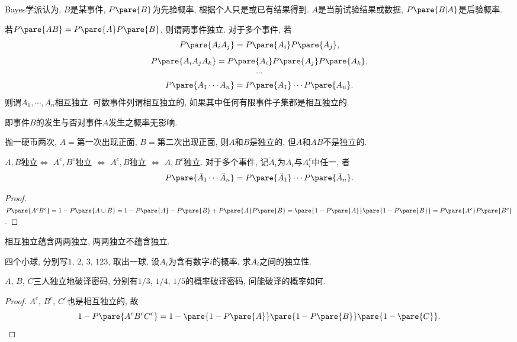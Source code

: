 \documentclass[../Statistics.tex]{subfiles}
\begin{document}
\begin{remark}
    Bayes学派认为, $B$是某事件, $P\pare{B}$为先验概率, 根据个人只是或已有结果得到. $A$是当前试验结果或数据, $P\pare{B\vert A}$是后验概率.
\end{remark}
\begin{definition}
    若$P\pare{AB} = P\pare{A}P\pare{B}$, 则谓两事件独立. 对于多个事件, 若
    \[ P\pare{A_iA_j} = P\pare{A_i}P\pare{A_j}, \]
    \[ P\pare{A_iA_jA_k} = P\pare{A_i}P\pare{A_j}P\pare{A_k}, \]
    \[ \cdots \]
    \[ P\pare{A_1\cdots A_n} = P\pare{A_1} \cdots P\pare{A_n}. \]
    则谓$A_1,\cdots, A_n$相互独立. 可数事件列谓相互独立的, 如果其中任何有限事件子集都是相互独立的.
\end{definition}
\begin{remark}
    即事件$B$的发生与否对事件$A$发生之概率无影响.
\end{remark}
\begin{sample}
    \begin{ex}
        抛一硬币两次, $A=$第一次出现正面, $B=$第二次出现正面, 则$A$和$B$是独立的, 但$A$和$AB$不是独立的.
    \end{ex}
\end{sample}
\begin{theorem}
    $A,B$独立$\Leftrightarrow$ $A^c,B^c$独立 $\Leftrightarrow$ $A^c,B$独立 $\Leftrightarrow$ $A,B^c$独立. 对于多个事件, 记$\tilde{A}_i$为$A_i$与$A_i^c$中任一, 者
    \[ P\pare{\tilde{A}_1\cdots \tilde{A}_n} = P\pare{\tilde{A}_1}\cdots P\pare{\tilde{A}_n}. \]
\end{theorem}
\begin{proof}
    $P\pare{A^cB^c} = 1-P\pare{A\cup B} = 1-P\pare{A} - P\pare{B} + P\pare{A}P\pare{B} = \pare{1-P\pare{A}}\pare{1-P\pare{B}} = P\pare{A^c}P\pare{B^c}$.
\end{proof}
\begin{pitfall}
    相互独立蕴含两两独立, 两两独立不蕴含独立.
\end{pitfall}
\begin{ex}
    四个小球, 分别写$1$, $2$, $3$, $123$, 取出一球, 设$A_i$为含有数字$i$的概率, 求$A_i$之间的独立性.
\end{ex}
\begin{sample}
    \begin{ex}
        $A$, $B$, $C$三人独立地破译密码, 分别有$1/3$, $1/4$, $1/5$的概率破译密码, 问能破译的概率如何.
    \end{ex}
    \begin{proof}
        $A^c$, $B^c$, $C^c$也是相互独立的, 故
        \[ 1-P\pare{A^cB^cC^c} = 1-\pare{1-P\pare{A}}\pare{1-P\pare{B}}\pare{1-\pare{C}}. \qedhere \]
    \end{proof}
\end{sample}
\end{document}
